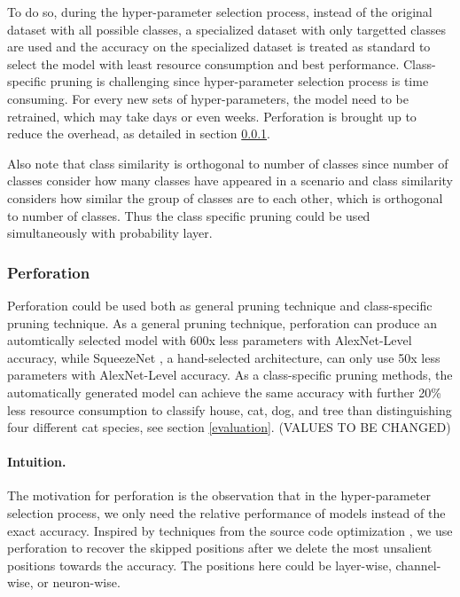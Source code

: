 \documentclass[pageno]{jpaper}
\begin{document}
To do so, during the hyper-parameter selection process, instead of the original dataset with all possible classes, a specialized dataset with only targetted classes are used and the accuracy on the specialized dataset is treated as standard to select the model with least resource consumption and best performance. Class-specific pruning is challenging since hyper-parameter selection process is time consuming. For every new sets of hyper-parameters, the model need to be retrained, which may take days or even weeks. Perforation is brought up to reduce the overhead, as detailed in section \ref{perforation}.

Also note that class similarity is orthogonal to number of classes since number of classes consider how many classes have appeared in a scenario and class similarity considers how similar the group of classes are to each other, which is orthogonal to number of classes. Thus the class specific pruning could be used simultaneously with probability layer.


\subsubsection{Perforation} \label{perforation}




Perforation could be used both as general pruning technique and class-specific pruning technique. As a general pruning technique, perforation can produce an automtically selected model with 600x less parameters with AlexNet-Level accuracy, while SqueezeNet \cite{iandola2016squeezenet}, a hand-selected architecture, can only use 50x less parameters with AlexNet-Level accuracy. As a class-specific pruning methods, the automatically generated model can achieve the same accuracy with further 20\% less resource consumption to classify house, cat, dog, and tree than distinguishing four different cat species, see section \ref{evaluation}. (VALUES TO BE CHANGED)



\paragraph{Intuition. } The motivation for perforation is the observation that in the hyper-parameter selection process, we only need the relative performance of models instead of the exact accuracy. Inspired by techniques from the source code optimization \cite{figurnov2016perforatedcnns}, we use perforation to recover the skipped positions after we delete the most unsalient positions towards the accuracy. The positions here could be layer-wise, channel-wise, or neuron-wise. 
\end{document}
